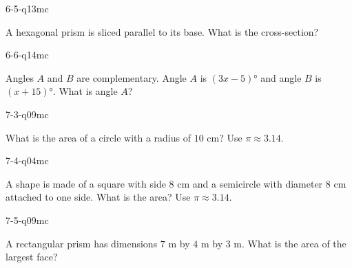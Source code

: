 \begin{practiceQuestion}{6-5-q13}{mc}
\begin{questionText}
A hexagonal prism is sliced parallel to its base. What is the cross-section?
\end{questionText}
\end{practiceQuestion}

\begin{practiceQuestion}{6-6-q14}{mc}
\begin{questionText}
Angles $A$ and $B$ are complementary. Angle $A$ is $(3x - 5)°$ and angle $B$ is $(x + 15)°$. What is angle $A$?
\end{questionText}
\end{practiceQuestion}

\begin{practiceQuestion}{7-3-q09}{mc}
\begin{questionText}
What is the area of a circle with a radius of $10$ cm? Use $\pi \approx 3.14$.
\end{questionText}
\end{practiceQuestion}

\begin{practiceQuestion}{7-4-q04}{mc}
\begin{questionText}
A shape is made of a square with side $8$ cm and a semicircle with diameter $8$ cm attached to one side. What is the area? Use $\pi \approx 3.14$.
\end{questionText}
\end{practiceQuestion}

\begin{practiceQuestion}{7-5-q09}{mc}
\begin{questionText}
A rectangular prism has dimensions $7$ m by $4$ m by $3$ m. What is the area of the largest face?
\end{questionText}
\end{practiceQuestion}

